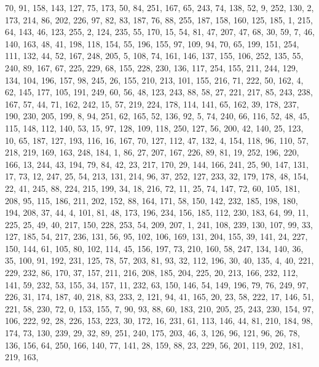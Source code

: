 \begin{DoxyCode}
       70, 91, 158, 143, 127, 75, 173, 50, 84, 251, 167, 65, 243, 74, 138, 52, 9, 252, 130, 2, 173, 214, 86, 202,
       226, 97, 82, 83, 187, 76, 88, 255, 187, 158, 160, 125, 185, 1, 215, 64, 143, 46, 123, 255, 2, 124, 235, 55,
       170, 15, 54, 81, 47, 207, 47, 68, 30, 59, 7, 46, 140, 163, 48, 41, 198, 118, 154, 55, 196, 155, 97, 109, 94,
       70, 65, 199, 151, 254, 111, 132, 44, 52, 167, 248, 205, 5, 108, 74, 161, 146, 137, 155, 106, 252, 135, 55,
       240, 89, 167, 67, 225, 229, 68, 155, 228, 230, 136, 117, 254, 155, 211, 244, 129, 134, 104, 196, 157, 98, 245,
       26, 155, 210, 213, 101, 155, 216, 71, 222, 50, 162, 4, 62, 145, 177, 105, 191, 249, 60, 56, 48, 123, 243,
       88, 58, 27, 221, 217, 85, 243, 238, 167, 57, 44, 71, 162, 242, 15, 57, 219, 224, 178, 114, 141, 65, 162, 39,
       178, 237, 190, 230, 205, 199, 8, 94, 251, 62, 165, 52, 136, 92, 5, 74, 240, 66, 116, 52, 48, 45, 115, 148,
       112, 140, 53, 15, 97, 128, 109, 118, 250, 127, 56, 200, 42, 140, 25, 123, 10, 65, 187, 127, 193, 116, 16, 167,
       70, 127, 112, 47, 132, 4, 154, 118, 96, 110, 57, 218, 219, 169, 163, 248, 184, 1, 86, 27, 207, 167, 226,
       89, 81, 19, 252, 196, 220, 166, 13, 244, 43, 194, 79, 84, 42, 23, 217, 170, 29, 144, 166, 241, 25, 90, 147,
       131, 17, 73, 12, 247, 25, 54, 213, 131, 214, 96, 37, 252, 127, 233, 32, 179, 178, 48, 154, 22, 41, 245, 88,
       224, 215, 199, 34, 18, 216, 72, 11, 25, 74, 147, 72, 60, 105, 181, 208, 95, 115, 186, 211, 202, 152, 88, 164,
       171, 58, 150, 142, 232, 185, 198, 180, 194, 208, 37, 44, 4, 101, 81, 48, 173, 196, 234, 156, 185, 112, 230,
       183, 64, 99, 11, 225, 25, 49, 40, 217, 150, 228, 253, 54, 209, 207, 1, 241, 108, 239, 130, 107, 99, 33, 127,
       185, 54, 217, 236, 131, 56, 95, 102, 106, 169, 131, 204, 155, 39, 141, 24, 227, 150, 144, 61, 105, 80, 102,
       114, 45, 156, 197, 73, 210, 160, 58, 247, 134, 140, 36, 35, 100, 91, 192, 231, 125, 78, 57, 203, 81, 93,
       32, 112, 196, 30, 40, 135, 4, 40, 221, 229, 232, 86, 170, 37, 157, 211, 216, 208, 185, 204, 225, 20, 213, 166,
       232, 112, 141, 59, 232, 53, 155, 34, 157, 11, 232, 63, 150, 146, 54, 149, 196, 79, 76, 249, 97, 226, 31,
       174, 187, 40, 218, 83, 233, 2, 121, 94, 41, 165, 20, 23, 58, 222, 17, 146, 51, 221, 58, 230, 72, 0, 153, 155,
       7, 90, 93, 88, 60, 183, 210, 205, 25, 243, 230, 154, 97, 106, 222, 92, 28, 226, 153, 223, 30, 172, 16, 231,
       61, 113, 146, 44, 81, 210, 184, 98, 174, 73, 130, 239, 29, 32, 89, 251, 240, 175, 203, 46, 3, 126, 96, 121,
       96, 26, 78, 136, 156, 64, 250, 166, 140, 77, 141, 28, 159, 88, 23, 229, 56, 201, 119, 202, 181, 219, 163,

\end{DoxyCode}
